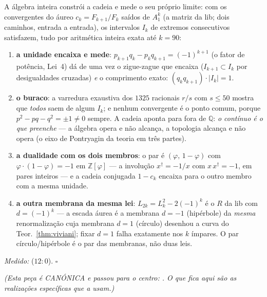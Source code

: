 \documentclass[livro.tex]{subfiles}
\begin{document}
\begin{teorema}\label{thm:encaixe}
A \'algebra inteira constr\'oi a cadeia e mede o seu pr\'oprio limite:
com os convergentes do \'aureo $c_{k}=F_{k+1}/F_{k}$ sa\'idos de
$A_{1}^{k}$ (a matriz  da lib; dois caminhos, entrada a
entrada), os intervalos $I_{k}$ de extremos consecutivos satisfazem,
tudo por aritm\'etica inteira exata at\'e $k=90$:
\begin{enumerate}
\item \textbf{a unidade encaixa e mede}:
$p_{k+1}q_{k}-p_{k}q_{k+1}=(-1)^{k+1}$ (o fator de pot\^encia,
Lei~4) d\'a de uma vez o zigue-zague que encaixa
($I_{k+1}\subset I_{k}$ por desigualdades cruzadas) \emph{e} o
comprimento exato: $(q_{k}q_{k+1})\cdot|I_{k}|=1$.
\item \textbf{o buraco}: a varredura exaustiva dos $1325$ racionais
$r/s$ com $s\le50$ mostra que \emph{todos} saem de algum $I_{k}$; e
nenhum convergente \'e o ponto comum, porque
$p^{2}-pq-q^{2}=\pm1\ne0$ sempre. A cadeia aponta para fora de
$\mathbb{Q}$: \emph{o cont\'inuo \'e o que preenche} --- a \'algebra
opera e n\~ao alcan\c{c}a, a topologia alcan\c{c}a e n\~ao opera (o
eixo de Pontryagin da teoria em tr\^es partes).
\item \textbf{a dualidade com os dois membros}: o par \'e
$(\varphi,\,1-\varphi)$ com $\varphi\cdot(1-\varphi)=-1$ em
$\mathbb{Z}[\varphi]$ --- a involu\c{c}\~ao $x^{\dagger}=-1/x$ com
$x\,x^{\dagger}=-1$, em pares inteiros --- e a cadeia conjugada
$1-c_{k}$ encaixa para o outro membro com a mesma unidade.
\item \textbf{a outra membrana da mesma lei}:
$L_{2k}=L_{k}^{2}-2(-1)^{k}$ \'e o $R$ da lib com $d=(-1)^{k}$ --- a
escada \'aurea \'e a membrana $d=-1$ (hip\'erbole) da \emph{mesma}
renormaliza\c{c}\~ao cuja membrana $d=1$ (c\'irculo) desenhou a curva
do Teor.~\ref{thm:viviani}; fixar $d=1$ falha exatamente nos $k$
\'impares. O par c\'irculo/hip\'erbole \'e o par das membranas, n\~ao
duas leis.
\end{enumerate}
\emph{Medido:}  ($12{:}0$).
$\square$
\end{teorema}

\noindent\emph{(Esta peça é CANÓNICA e passou para o centro: . O que fica aqui são as realizações específicas que a usam.)}
\end{document}
